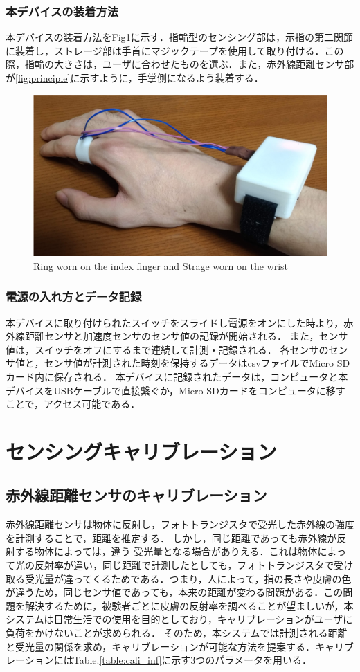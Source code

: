 \subsubsection*{本デバイスの装着方法}
本デバイスの装着方法をFig\ref{fig:ring}に示す．指輪型のセンシング部は，示指の第二関節に装着し，ストレージ部は手首にマジックテープを使用して取り付ける．この際，指輪の大きさは，ユーザに合わせたものを選ぶ．また，赤外線距離センサ部が\ref{fig:principle}に示すように，手掌側になるよう装着する．
\begin{figure}[H]
  \centering
  \includegraphics[width=0.8\linewidth]{fig/fal4.png}
  \caption{Ring worn on the index finger and Strage worn on the wrist}
  \label{fig:ring}
\end{figure}

\subsubsection*{電源の入れ方とデータ記録}
本デバイスに取り付けられたスイッチをスライドし電源をオンにした時より，赤外線距離センサと加速度センサのセンサ値の記録が開始される．
また，センサ値は，スイッチをオフにするまで連続して計測・記録される．
各センサのセンサ値と，センサ値が計測された時刻を保持するデータはcsvファイルでMicro SDカード内に保存される．
本デバイスに記録されたデータは，コンピュータと本デバイスをUSBケーブルで直接繋ぐか，Micro SDカードをコンピュータに移すことで，アクセス可能である．



\section{センシングキャリブレーション}
\subsection*{赤外線距離センサのキャリブレーション}
赤外線距離センサは物体に反射し，フォトトランジスタで受光した赤外線の強度を計測することで，距離を推定する．
しかし，同じ距離であっても赤外線が反射する物体によっては，違う
受光量となる場合がありえる．これは物体によって光の反射率が違い，同じ距離で計測したとしても，フォトトランジスタで受け取る受光量が違ってくるためである．つまり，人によって，指の長さや皮膚の色が違うため，同じセンサ値であっても，本来の距離が変わる問題がある．この問題を解決するために，被験者ごとに皮膚の反射率を調べることが望ましいが，本システムは日常生活での使用を目的としており，キャリブレーションがユーザに負荷をかけないことが求められる．
そのため，本システムでは計測される距離と受光量の関係を求め，キャリブレーションが可能な方法を提案する．キャリブレーションにはTable.\ref{table:cali_inf}に示す3つのパラメータを用いる．

